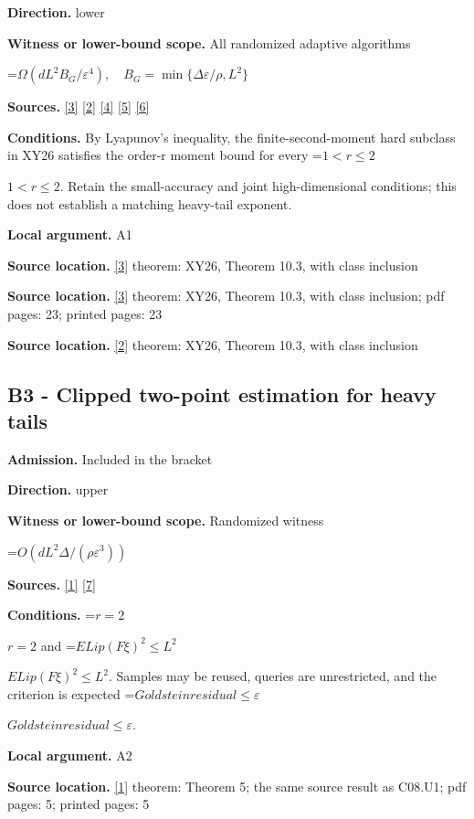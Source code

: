 \documentclass[10pt,a4paper]{article}
\newcommand{\AtlasMath}[1]{\par\begingroup\centering\setbox0=\hbox{$\displaystyle #1$}\ifdim\wd0>1.4\linewidth\typeout{ATLAS WIDE FORMULA: \the\wd0}\fi\ifdim\wd0>\linewidth\resizebox{\linewidth}{!}{\box0}\else\box0\fi\par\endgroup}
\newcommand{\AtlasInlineMath}[1]{\begingroup\setbox0=\hbox{$#1$}\ifdim\wd0>.4\linewidth\endgroup\AtlasMath{#1}\else\endgroup$#1$\fi}
\begin{document}
\textbf{Direction.} lower

\textbf{Witness or lower-bound scope.} All randomized adaptive algorithms

\AtlasMath{\Omega(dL^2B_G/\varepsilon^4),\quad B_G=\min\{\Delta\varepsilon/\rho,L^2\}}
\textbf{Sources.} \href{https://arxiv.org/html/2610.19652v1}{[3]} \href{https://arxiv.org/html/2605.24513v1}{[2]} \href{https://arxiv.org/html/2609.00045v3}{[4]} \href{https://arxiv.org/pdf/2610.00245v2}{[5]} \href{https://arxiv.org/html/2610.17074v1}{[6]}

\textbf{Conditions.} By Lyapunov's inequality, the finite-second-moment hard subclass in XY26 satisfies the order-r moment bound for every \AtlasInlineMath{1<r\le2}. Retain the small-accuracy and joint high-dimensional conditions; this does not establish a matching heavy-tail exponent.

\textbf{Local argument.} A1

\textbf{Source location.} \href{https://arxiv.org/html/2610.19652v1}{[3]} theorem: XY26, Theorem 10.3, with class inclusion

\textbf{Source location.} \href{https://arxiv.org/html/2610.19652v1}{[3]} theorem: XY26, Theorem 10.3, with class inclusion; pdf pages: 23; printed pages: 23

\textbf{Source location.} \href{https://arxiv.org/html/2605.24513v1}{[2]} theorem: XY26, Theorem 10.3, with class inclusion

\subsection{B3 - Clipped two-point estimation for heavy tails}
\textbf{Admission.} Included in the bracket

\textbf{Direction.} upper

\textbf{Witness or lower-bound scope.} Randomized witness

\AtlasMath{O(dL^2\Delta/(\rho\varepsilon^3))}
\textbf{Sources.} \href{https://www.jmlr.org/papers/volume25/23-1159/23-1159.pdf}{[1]} \href{https://arxiv.org/html/2610.00275v2}{[7]}

\textbf{Conditions.} \AtlasInlineMath{r=2} and \AtlasInlineMath{E Lip(F\xi )^2\le L^2}. Samples may be reused, queries are unrestricted, and the criterion is expected \AtlasInlineMath{Goldstein residual\le \varepsilon}.

\textbf{Local argument.} A2

\textbf{Source location.} \href{https://www.jmlr.org/papers/volume25/23-1159/23-1159.pdf}{[1]} theorem: Theorem 5; the same source result as C08.U1; pdf pages: 5; printed pages: 5
\end{document}
